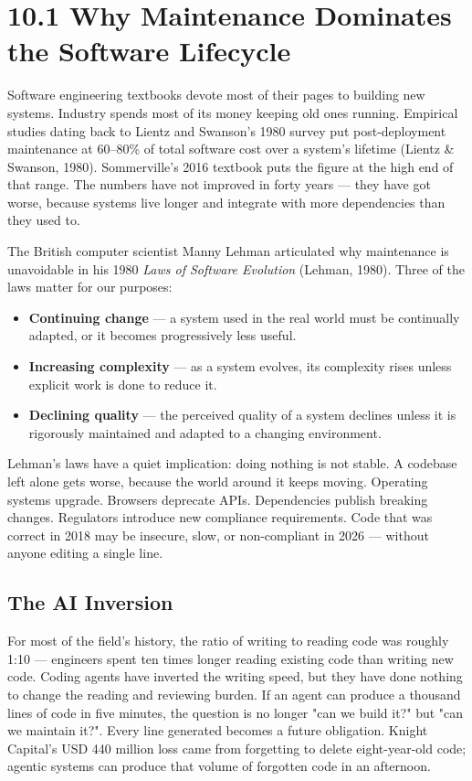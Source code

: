 \documentclass[11pt,a4paper]{book}
\begin{document}
\medskip

\section{10.1 Why Maintenance Dominates the Software Lifecycle}

Software engineering textbooks devote most of their pages to building new systems. Industry spends most of its money keeping old ones running. Empirical studies dating back to Lientz and Swanson's 1980 survey put post-deployment maintenance at 60--80\% of total software cost over a system's lifetime (Lientz \& Swanson, 1980). Sommerville's 2016 textbook puts the figure at the high end of that range. The numbers have not improved in forty years --- they have got worse, because systems live longer and integrate with more dependencies than they used to.

The British computer scientist Manny Lehman articulated why maintenance is unavoidable in his 1980 \textit{Laws of Software Evolution} (Lehman, 1980). Three of the laws matter for our purposes:

\begin{itemize}
  \item \textbf{Continuing change} --- a system used in the real world must be continually adapted, or it becomes progressively less useful.
  \item \textbf{Increasing complexity} --- as a system evolves, its complexity rises unless explicit work is done to reduce it.
  \item \textbf{Declining quality} --- the perceived quality of a system declines unless it is rigorously maintained and adapted to a changing environment.
\end{itemize}

Lehman's laws have a quiet implication: doing nothing is not stable. A codebase left alone gets worse, because the world around it keeps moving. Operating systems upgrade. Browsers deprecate APIs. Dependencies publish breaking changes. Regulators introduce new compliance requirements. Code that was correct in 2018 may be insecure, slow, or non-compliant in 2026 --- without anyone editing a single line.

\subsection{The AI Inversion}

For most of the field's history, the ratio of writing to reading code was roughly 1:10 --- engineers spent ten times longer reading existing code than writing new code. Coding agents have inverted the writing speed, but they have done nothing to change the reading and reviewing burden. If an agent can produce a thousand lines of code in five minutes, the question is no longer "can we build it?" but "can we maintain it?". Every line generated becomes a future obligation. Knight Capital's USD 440 million loss came from forgetting to delete eight-year-old code; agentic systems can produce that volume of forgotten code in an afternoon.
\end{document}
